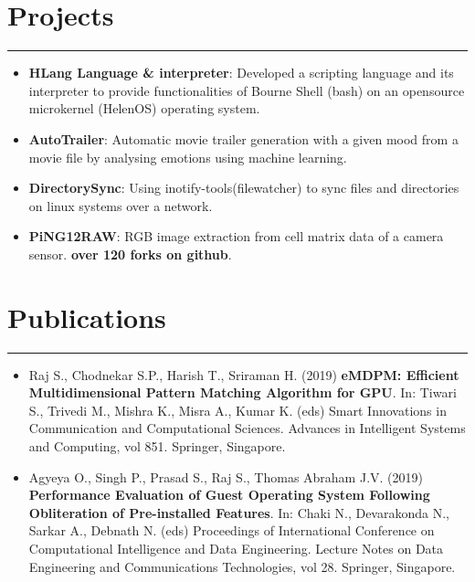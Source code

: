 \documentclass[a4paper,6pt]{article}
\begin{document}
\vspace{-9px}
\section*{Projects}
\vspace{-8px}
\hrule
\vspace{4px}
\hspace{5px}
\begin{itemize}
    \item \textbf{HLang Language \& interpreter}: \small Developed a scripting language and its interpreter to provide functionalities of Bourne Shell (bash) on an opensource microkernel (HelenOS) operating system.
\normalsize
\vspace{2px}
	\item \textbf{AutoTrailer}: \small Automatic movie trailer generation with a given mood from a movie file by analysing emotions using machine learning. 
\vspace{2px}
\normalsize
	\item \textbf{DirectorySync}: \small Using inotify-tools(filewatcher) to sync files and directories on linux systems over a network.
\vspace{2px}
\normalsize
	\item \textbf{PiNG12RAW}: \small RGB image extraction from cell matrix data of a camera sensor. \textcolor{mygray}{\textbf{over 120 forks on github}}. 
\normalsize
\end{itemize}

\vspace{-9px}
\section*{Publications}
\vspace{-8px}
\hrule
\vspace{8px}
\begin{itemize}
	\item \small Raj S., Chodnekar S.P., Harish T., Sriraman H. (2019) \textcolor{mygray}{\textbf{eMDPM: Efficient Multidimensional Pattern Matching Algorithm for GPU}}. In: Tiwari S., Trivedi M., Mishra K., Misra A., Kumar K. (eds) Smart Innovations in Communication and Computational Sciences. Advances in Intelligent Systems and Computing, vol 851. Springer, Singapore. 
\normalsize
\vspace{2px}
	\item \small Agyeya O., Singh P., Prasad S., Raj S., Thomas Abraham J.V. (2019) \textcolor{mygray}{\textbf{Performance Evaluation of Guest Operating System Following Obliteration of Pre-installed Features}}. In: Chaki N., Devarakonda N., Sarkar A., Debnath N. (eds) Proceedings of International Conference on Computational Intelligence and Data Engineering. Lecture Notes on Data Engineering and Communications Technologies, vol 28. Springer, Singapore.
\normalsize
\end{itemize}
\end{document}
